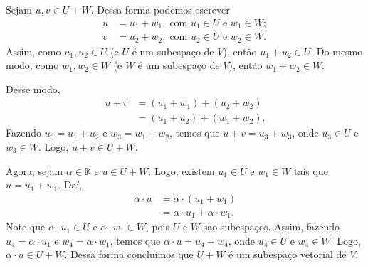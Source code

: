 Sejam $u,v \in U+W$. Dessa forma podemos escrever
\begin{align*}
u&=u_1+w_1, \; \text{com $u_1 \in U$ e $w_1 \in W$};\\
v&=u_2+w_2, \; \text{com $u_2\in U$ e $w_2 \in W$}.
\end{align*}
Assim, como $u_1, u_2 \in U$ (e $U$ é um subespaço de $V$), então $u_1+u_2 \in U$.  Do mesmo modo, como $w_1, w_2 \in W$ (e $W$ é um subespaço de $V$), então $w_1+w_2 \in W$.

Desse modo,
\begin{align*}
u+v&=(u_1+w_1) + (u_2+w_2) \\
         &=(u_1+u_2)+(w_1+w_2).
\end{align*}
Fazendo $u_3=u_1+u_2$ e $w_3=w_1+w_2$, temos que $u+v=u_3+w_3$, onde $u_3 \in U$ e $w_3 \in W$. Logo, $u+v \in U+W$.

Agora, sejam $\alpha \in \mathbb{K}$  e $u \in U+W$.  Logo, existem $u_1 \in U$ e $w_1 \in W$ tais que $u=u_1+w_1$. Daí,
\begin{align*}
\alpha \cdot  u&=\alpha \cdot (u_1+w_1) \\
         &=\alpha \cdot  u_1+\alpha \cdot  w_1.
\end{align*}
Note que $\alpha \cdot  u_1 \in U$ e $\alpha \cdot  w_1 \in W$, pois $U$ e $W$ sao subespaços.  Assim, fazendo $u_4=\alpha \cdot  u_1$ e $w_4=\alpha \cdot  w_1$, temos que $\alpha \cdot  u=u_4+w_4$, onde $u_4 \in U$ e $w_4 \in W$. Logo, $\alpha \cdot  u\in U+W$. Dessa forma concluimos que $U+W$ é um subespaço vetorial de $V$.

